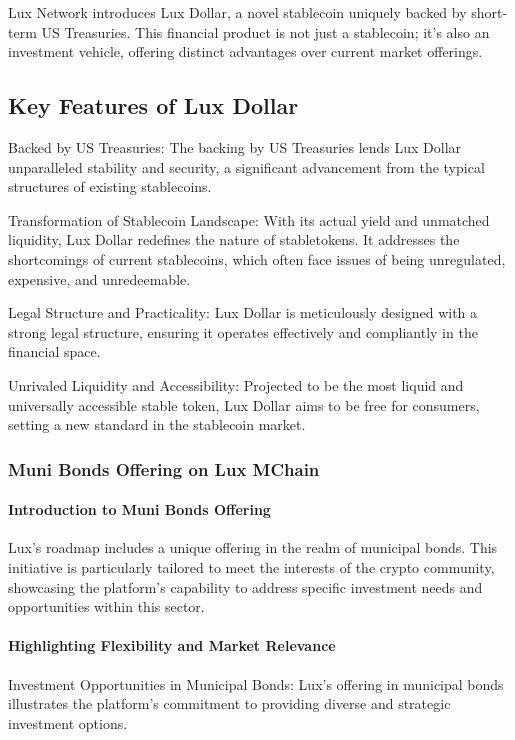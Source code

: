 \documentclass[11pt]{article}
\begin{document}
Lux Network introduces Lux Dollar, a novel stablecoin uniquely backed by short-term US Treasuries. This financial product is not just a stablecoin; it's also an investment vehicle, offering distinct advantages over current market offerings.


\subsection{Key Features of Lux Dollar}

Backed by US Treasuries: The backing by US Treasuries lends Lux Dollar unparalleled stability and security, a significant advancement from the typical structures of existing stablecoins.


Transformation of Stablecoin Landscape: With its actual yield and unmatched liquidity, Lux Dollar redefines the nature of stabletokens. It addresses the shortcomings of current stablecoins, which often face issues of being unregulated, expensive, and unredeemable.


Legal Structure and Practicality: Lux Dollar is meticulously designed with a strong legal structure, ensuring it operates effectively and compliantly in the financial space.


Unrivaled Liquidity and Accessibility: Projected to be the most liquid and universally accessible stable token, Lux Dollar aims to be free for consumers, setting a new standard in the stablecoin market.


\subsubsection{Muni Bonds Offering on Lux MChain}

\paragraph{Introduction to Muni Bonds Offering}

Lux's roadmap includes a unique offering in the realm of municipal bonds. This initiative is particularly tailored to meet the interests of the crypto community, showcasing the platform's capability to address specific investment needs and opportunities within this sector.


\paragraph{Highlighting Flexibility and Market Relevance}

Investment Opportunities in Municipal Bonds: Lux's offering in municipal bonds illustrates the platform's commitment to providing diverse and strategic investment options.
\end{document}
